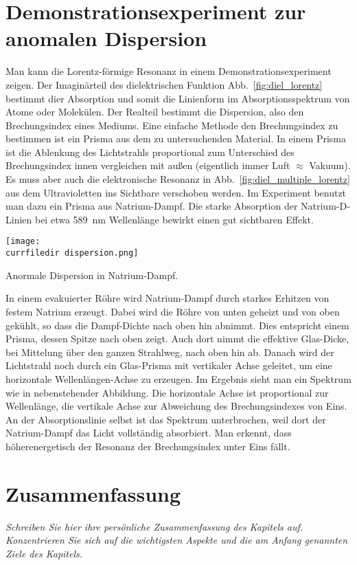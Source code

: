 \section{Demonstrationsexperiment zur anomalen Dispersion}

Man kann die Lorentz-förmige Resonanz in einem Demonstrationsexperiment zeigen. Der Imaginärteil des dielektrischen Funktion Abb.~\ref{fig:diel_lorentz} bestimmt dier Absorption und somit die Linienform im Absorptionsspektrum von Atome oder Molekülen. Der Realteil bestimmt die Dispersion, also den Brechungsindex eines Mediums. Eine einfache Methode den Brechungsindex zu bestimmen ist ein Prisma aus dem zu untersuchenden Material. In einem Prisma ist die Ablenkung des Lichtstrahls proportional zum Unterschied des Brechungsindex innen vergleichen mit außen (eigentlich immer Luft $\approx$ Vakuum). Es muss aber auch die elektronische Resonanz in Abb.~\ref{fig:diel_multiple_lorentz} aus dem Ultravioletten ins Sichtbare verschoben werden. Im Experiment benutzt man dazu ein Prisma aus Natrium-Dampf. Die starke Absorption der Natrium-D-Linien bei etwa 589~nm Wellenlänge bewirkt einen gut sichtbaren Effekt. 


\begin{marginfigure}
\texttt{[image: \\currfiledir dispersion.png]}
\caption{Anormale Dispersion in Natrium-Dampf. }
\end{marginfigure}


In einem evakuierter Röhre wird Natrium-Dampf durch starkes Erhitzen von festem Natrium erzeugt.  Dabei wird die Röhre von unten geheizt und von oben gekühlt, so dass die Dampf-Dichte nach oben hin abnimmt. Dies entspricht einem Prisma, dessen Spitze nach oben zeigt. Auch dort nimmt die effektive Glas-Dicke, bei Mittelung über den ganzen Strahlweg, nach oben hin ab. Danach wird der Lichtstrahl noch durch ein Glas-Prisma mit vertikaler Achse geleitet, um  eine horizontale Wellenlängen-Achse zu erzeugen. Im Ergebnis sieht man ein Spektrum wie in nebenstehender Abbildung. Die horizontale Achse ist proportional zur Wellenlänge, die vertikale Achse zur Abweichung des Brechungsindexes von Eins. An der Absorptionslinie selbst ist das Spektrum unterbrochen, weil dort der Natrium-Dampf das Licht vollständig absorbiert. Man erkennt, dass höherenergetisch der Resonanz der Brechungsindex unter Eins fällt.


\section{Zusammenfassung}

\textit{Schreiben Sie hier ihre persönliche Zusammenfassung des Kapitels auf. Konzentrieren Sie sich auf die wichtigsten Aspekte und die am Anfang genannten Ziele des Kapitels.}

\vspace*{10cm}


\printbibliography[segment=\therefsegment,heading=subbibliography]
